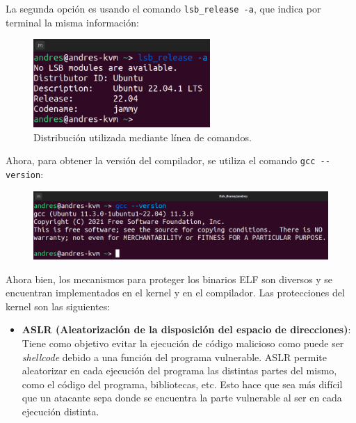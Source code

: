 \documentclass{article}
\begin{document}
\bigskip

La segunda opción es usando el comando \verb|lsb_release -a|, que indica por terminal la misma información:

\begin{figure}[H]
    \centering
    \includegraphics[width=0.6\textwidth]{imagenes/Captura desde 2022-11-23 10-38-58.png}
    \caption{Distribución utilizada mediante línea de comandos.}
\end{figure}

\newpage

Ahora, para obtener la versión del compilador, se utiliza el comando \verb|gcc --version|:

\begin{figure}[H]
    \includegraphics[width=\textwidth]{imagenes/Captura desde 2022-11-23 10-39-52.png}
\end{figure}


Ahora bien, los mecanismos para proteger los binarios ELF son diversos y se encuentran implementados en el kernel y en el compilador. Las protecciones del kernel son las siguientes:

\begin{itemize}
    \item \textbf{ASLR (Aleatorización de la disposición del espacio de direcciones)}: Tiene como objetivo evitar la ejecución de código malicioso como puede ser \textit{shellcode} debido a una función del programa vulnerable. ASLR permite aleatorizar en cada ejecución del programa las distintas partes del mismo, como el código del programa, bibliotecas, etc. Esto hace que sea más difícil que un atacante sepa donde se encuentra la parte vulnerable al ser en cada ejecución distinta.
\end{itemize}
\end{document}
